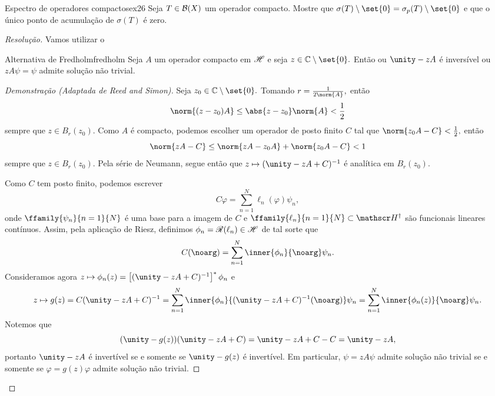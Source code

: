 \begin{exercício}{Espectro de operadores compactos}{ex26}
  Seja \(T \in \mathcal{B}(X)\) um operador compacto. Mostre que \(\sigma(T)\setminus\set{0} = \sigma_p(T)\setminus\set{0}\) e que o único ponto de acumulação de \(\sigma(T)\) é zero.
\end{exercício}
\begin{proof}[Resolução]
  Vamos utilizar o
  \begin{theorem}{Alternativa de Fredholm}{fredholm}
    Seja \(A\) um operador compacto em \(\mathscr{H}\) e seja \(z \in \mathbb{C}\setminus\set{0}.\) Então ou \(\unity - zA\) é inversível ou \(zA\psi = \psi\) admite solução não trivial.
  \end{theorem}
  \begin{proof}[Demonstração (Adaptada de Reed and Simon)]
    Seja \(z_0 \in \mathbb{C}\setminus\set{0}.\) Tomando \(r = \frac{1}{2\norm{A}},\) então
    \begin{equation*}
      \norm{(z-z_0) A} \leq \abs{z - z_0} \norm{A} < \frac12
    \end{equation*}
    sempre que \(z \in B_r(z_0).\) Como \(A\) é compacto, podemos escolher um operador de posto finito \(C\) tal que \(\norm{z_0A - C} < \frac12,\) então
    \begin{equation*}
      \norm{zA - C} \leq \norm{zA - z_0A} + \norm{z_0A - C} < 1
    \end{equation*}
    sempre que \(z \in B_r(z_0).\) Pela série de Neumann, segue então que \(z \mapsto (\unity - zA + C)^{-1}\) é analítica em \(B_r(z_0)\).

    Como \(C\) tem posto finito, podemos escrever
    \begin{equation*}
      C\varphi = \sum_{n = 1}^N \ell_n(\varphi)\psi_n,
    \end{equation*}
    onde \(\ffamily{\psi_n}{n=1}{N}\) é uma base para a imagem de \(C\) e \(\ffamily{\ell_n}{n=1}{N}\subset \hilbert^\dag\) são funcionais lineares contínuos. Assim, pela aplicação de Riesz, definimos \(\phi_n = \mathscr{R}(\ell_n) \in \mathscr{H}\) de tal sorte que
    \begin{equation*}
      C(\noarg) = \sum_{n=1}^N\inner{\phi_n}{\noarg}\psi_n.
    \end{equation*}
    Consideramos agora \(z \mapsto \phi_n(z) = \left[(\unity - zA + C)^{-1}\right]^*\phi_n\) e
    \begin{equation*}
      z \mapsto g(z) = C(\unity - zA + C)^{-1} = \sum_{n = 1}^N\inner{\phi_n}{(\unity - zA + C)^{-1}(\noarg)}\psi_n = \sum_{n = 1}^N\inner{\phi_n(z)}{\noarg}\psi_n.
    \end{equation*}
    Notemos que
    \begin{equation*}
      (\unity - g(z))(\unity - zA + C) = \unity - zA + C - C = \unity - zA,
    \end{equation*}
    portanto \(\unity - zA\) é invertível se e somente se \(\unity - g(z)\) é invertível. Em particular, \(\psi = zA\psi\) admite solução não trivial se e somente se \(\varphi = g(z) \varphi\) admite solução não trivial.


\end{proof}
\end{proof}
